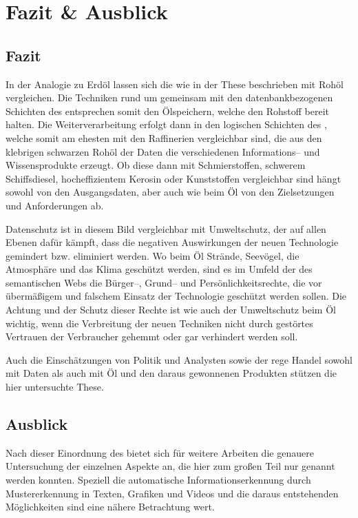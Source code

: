 \section{Fazit \& Ausblick}

\subsection{Fazit}

In der Analogie zu Erdöl lassen sich die  wie in der These beschrieben mit Rohöl vergleichen. Die Techniken rund um  gemeinsam mit den datenbankbezogenen Schichten des  entsprechen somit den Ölspeichern, welche den Rohstoff bereit halten. Die Weiterverarbeitung erfolgt dann in den logischen Schichten des , welche somit am ehesten mit den Raffinerien vergleichbar sind, die aus den klebrigen schwarzen Rohöl der Daten die verschiedenen Informations-- und Wissensprodukte erzeugt. Ob diese dann mit Schmierstoffen, schwerem Schiffsdiesel, hocheffizientem Kerosin oder Kunststoffen vergleichbar sind hängt sowohl von den Ausgangsdaten, aber auch wie beim Öl von den Zielsetzungen und Anforderungen ab.

Datenschutz ist in diesem Bild vergleichbar mit Umweltschutz, der auf allen Ebenen dafür kämpft, dass die negativen Auswirkungen der neuen Technologie gemindert bzw. eliminiert werden. Wo beim Öl Strände, Seevögel, die Atmosphäre und das Klima geschützt werden, sind es  im Umfeld der des semantischen Webs die Bürger--, Grund-- und Persönlichkeitsrechte, die vor übermäßigem und falschem Einsatz der Technologie geschützt werden sollen. Die Achtung und der Schutz dieser Rechte ist wie auch der Umweltschutz beim Öl wichtig, wenn die Verbreitung der neuen Techniken nicht durch gestörtes Vertrauen der Verbraucher gehemmt oder gar verhindert werden soll.

Auch die Einschätzungen von Politik und Analysten sowie der rege Handel sowohl mit Daten als auch mit Öl und den daraus gewonnenen Produkten stützen die hier untersuchte These.

\subsection{Ausblick}
\label{ausblick}

Nach dieser Einordnung des  bietet sich für weitere Arbeiten die genauere Untersuchung der einzelnen Aspekte an, die hier zum großen Teil nur genannt werden konnten. Speziell die automatische Informationserkennung durch Mustererkennung in Texten, Grafiken und Videos und die daraus entstehenden Möglichkeiten sind eine nähere Betrachtung wert. 

